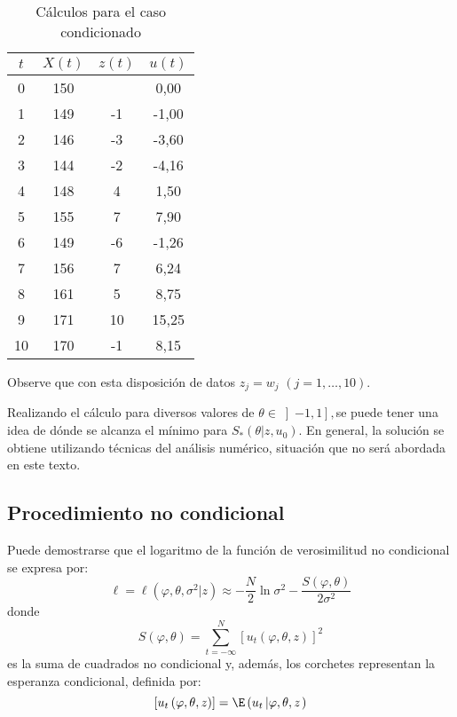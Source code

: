 \begin{ejemplo}
\begin{table}[H]
\centering
\begin{tabular}{@{} cccc @{}}
\toprule
$t$& $X(t)$& $z(t)$& $u(t)$ \\
\midrule
0& 150& & 0,00 \\
1& 149& -1& -1,00 \\
2& 146& -3& -3,60 \\
3& 144& -2& -4,16 \\
4& 148& 4& 1,50 \\
5& 155& 7& 7,90 \\
6& 149& -6& -1,26 \\
7& 156& 7& 6,24 \\
8& 161& 5& 8,75 \\
9& 171& 10& 15,25 \\
10& 170& -1& 8,15 \\
\bottomrule
\end{tabular}
\caption{C\'{a}lculos para el caso condicionado}
\end{table}

Observe que con esta disposici\'{o}n de datos $z_{j} =w_{j}$ $\left( {j=1,\ldots , 10} \right).$\newline

Realizando el c\'{a}lculo para diversos valores de $\theta \in \left] {-1,1} \right],$se puede tener una idea de d\'{o}nde se alcanza el m\'{i}nimo para $S_{\ast } \left( {\theta \left| {z,u_{0} } \right.} \right).$ En general, la soluci\'{o}n se obtiene utilizando t\'{e}cnicas del an\'{a}lisis num\'{e}rico, situaci\'{o}n que no ser\'{a} abordada en este texto.
\end{ejemplo}


\subsection{Procedimiento no condicional}

Puede demostrarse que el logaritmo de la funci\'{o}n de verosimilitud no condicional se expresa por:
\[
\ell =\ell \left( {\varphi ,\theta ,\sigma^{2}\left| z \right.} \right)\approx -\frac{N}{2}\ln \sigma^{2}-\frac{S\left( {\varphi, \theta} \right)}{2\sigma^{2}}
\]
donde
\[
S\left( {\varphi ,\theta } \right)=\sum_{t=-\infty }^N {\left[ {u_{t} \left( {\varphi ,\theta ,z} \right)} \right]^{2}} 
\]
es la suma de cuadrados no condicional y, adem\'{a}s, los corchetes representan la esperanza condicional, definida por:
\[
\left[ {u_{t} \left( {\varphi ,\theta , z} \right)} \right]=\E\left({u_{t} \left| {\varphi ,\theta ,z} \right.} \right)
\]


